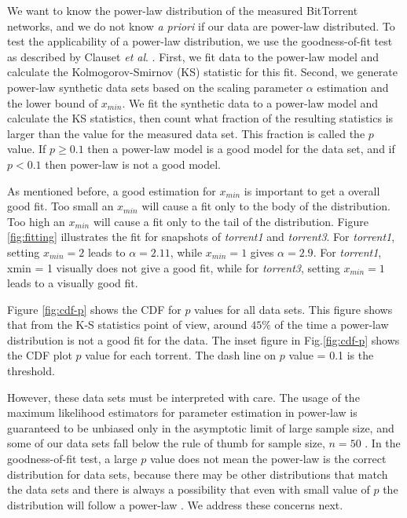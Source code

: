 We want to know the power-law distribution of the measured BitTorrent networks, and we do not know \textit{a priori} if our data are power-law distributed.
To test the applicability of a power-law distribution, we use the goodness-of-fit test as described by Clauset \textit{et al}. \cite{clauset2009power}. 
First, we fit data to the power-law model and calculate the Kolmogorov-Smirnov (KS) statistic for this fit. 
Second, we generate power-law synthetic data sets based on the scaling parameter $\alpha$ estimation and the lower bound of $x_{min}$. 
We fit the synthetic data to a power-law model and calculate the KS statistics, then count what fraction of the resulting statistics is larger than the value for the measured data set. 
This fraction is called the $p$ value.  
If $p \geq 0.1$ then a power-law model is a good model for the data set, and if $p < 0.1$ then power-law is not a good model.

As mentioned before, a good estimation for $x_{min}$ is important to get a overall good fit.
Too small an $x_{min}$ will cause a fit only to the body of the distribution.
Too high an $x_{min}$ will cause a fit only to the tail of the distribution.
Figure \ref{fig:fitting} illustrates the fit for snapshots of \emph{torrent1} and \emph{torrent3}.
For \emph{torrent1}, setting $x_{min}=2$  leads to  $\alpha=2.11$, while $x_{min}=1$ gives $\alpha=2.9$.
For \emph{torrent1}, xmin = 1 visually does not give a good fit, while for  \emph{torrent3}, setting $x_{min}=1$ leads to a visually good fit.

Figure \ref{fig:cdf-p} shows the CDF for $p$ values for all data sets. 
This figure shows that from the K-S statistics point of view, around $45\%$ of the time a power-law distribution is not a good fit for the data. 
The inset figure in Fig.\ref{fig:cdf-p} shows the CDF plot $p$ value for each torrent. 
The dash line on $p$ value = 0.1 is the threshold.

However, these data sets must be interpreted with care. 
The usage of the maximum likelihood estimators for parameter estimation in power-law is guaranteed to be unbiased only in the asymptotic limit of large sample size, and some of our data sets fall below the rule of thumb for sample size, $n=50$ \cite{clauset2009power}. 
In the goodness-of-fit test, a large $p$ value does not mean the power-law  is the correct distribution for data sets, because there may be other distributions that match the data sets and there is always a possibility that even with small value of $p$ the distribution will follow a power-law \cite{clauset2009power}. 
We address these concerns next.

